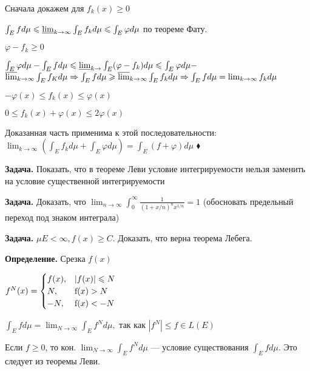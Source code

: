 Сначала докажем для $f_k(x) \geqslant 0$

$\int_E f d \mu \leqslant \varliminf_{k \rightarrow \infty} \int_E
f_k d \mu \leqslant \int_E \varphi d \mu$ по теореме Фату.

$\varphi - f_k \geqslant 0$

$\int_E \varphi d \mu - \int_E f d \mu \leqslant \varliminf_{k
\rightarrow} \int_E (\varphi - f_k) d \mu \leqslant \int_E \varphi
d \mu -$
%
%
%
%
%
%
%
%
%
%
%
%
$ \varlimsup_{k \rightarrow \infty} \int_E f_K d \mu \Rightarrow
\int_E f d\mu \geqslant \varlimsup_{k \rightarrow \infty} \int_E
f_k d \mu \Rightarrow \int_E f d \mu = \lim_{k \rightarrow \infty}
f_k d \mu$

$-\varphi(x) \leqslant f_k(x) \leqslant \varphi(x)$

$0 \leqslant f_k(x) + \varphi(x) \leqslant 2 \varphi(x)$

Доказанная часть применима к этой последовательности:
 $\lim_{k \rightarrow \infty} (\int_E f_k d \mu + \int_E
\varphi d \mu) = \int_E (f + \varphi) d \mu$ $\blacklozenge$

\textbf{Задача.} \quad Показать, что в теореме Леви условие
интегрируемости нельзя заменить на условие существенной
интегрируемости

\textbf{Задача.} Доказать, что \quad $\lim_{n \rightarrow \infty}
\int_0^{\infty} \frac{1}{(1 + x/n)^n x^{1/n}} = 1$ (обосновать
предельный переход под знаком интеграла)

\textbf{Задача.} \quad $\mu E < \infty, f(x) \geqslant C$.
Доказать, что верна теорема Лебега.


\textbf{Определение.} \quad Срезка $f(x)$

$f^N(x) =
\begin {cases}
f(x), &\text |f(x)| \leqslant N  \\
N, &\text f(x) > N \\
-N, &\text f(x) < -N
\end {cases} $


$\int_E f d \mu = \lim_{N \rightarrow \infty} \int_E f^N d \mu,$
так как $|f^N| \leqslant f \in L(E)$

Если $f \geqslant 0$, то кон. $\lim_{N \rightarrow \infty} \int_E
f^N d\mu$ --- условие существования $\int_E f d \mu$. Это следует
из теоремы Леви.

